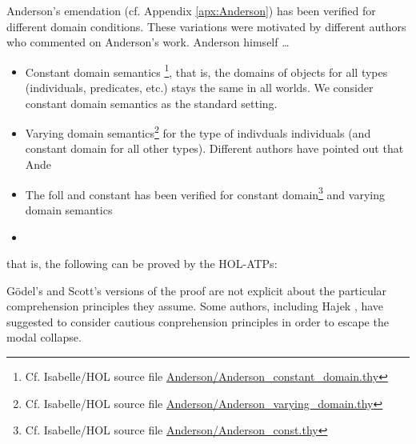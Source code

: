 \documentclass{birkjour}
\theoremstyle{definition}
\theoremstyle{remark}
\numberwithin{equation}{section}
\begin{document}
Anderson's emendation (cf. Appendix \ref{apx:Anderson}) has been
verified for different domain conditions. These variations were
motivated by different authors who commented on Anderson's work. Anderson himself \ldots
\begin{itemize}
\item Constant domain semantics \footnote{Cf. Isabelle/HOL source file
    \url{Anderson/Anderson_constant_domain.thy}}, that is, the domains of
  objects for all types (individuals, predicates, etc.) stays the same
  in all worlds. We consider constant domain semantics as the standard
  setting.
\item Varying domain semantics\footnote{Cf. Isabelle/HOL source file \url{Anderson/Anderson_varying_domain.thy}} for the type of indivduals individuals
  (and constant domain for all other types). Different authors have pointed out that 
  Ande
\item The foll
and constant 
has been verified for constant domain\footnote{Cf. Isabelle/HOL source file \url{Anderson/Anderson_const.thy}} and varying
  domain semantics
\item 
\end{itemize}


 that is, the following can be proved by the HOL-ATPs:
 
G\"odel's and Scott's versions of the proof are not explicit about the
particular comprehension principles they assume.  Some authors,
including Hajek \cite{Hajek_der_Mathematiker,Hajek_Magari_and_others},
have suggested to consider cautious conprehension principles in order
to escape the modal collapse.









\end{document}
